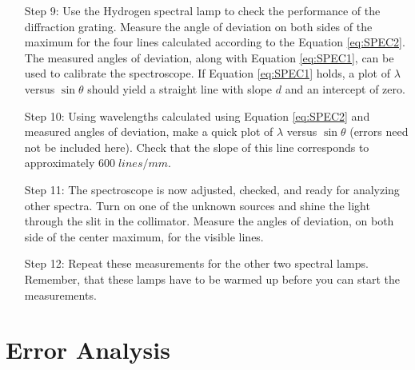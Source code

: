 \documentclass[12pt, a4paper, oneside, openright, titlepage]{book}
\begin{document}
\begin{itemize}[leftmargin = 50pt]
    \item[Step 9:] Use the Hydrogen spectral lamp to check the performance of the diffraction grating. Measure the angle of deviation on both sides of the maximum for the four lines calculated according to the Equation \ref{eq:SPEC2}. The measured angles of deviation, along with Equation \ref{eq:SPEC1}, can be used to calibrate the spectroscope. If Equation \ref{eq:SPEC1} holds, a plot of $\lambda$ versus $\sin\theta$ should yield a straight line with slope $d$ and an intercept of zero.
    \item[Step 10:] Using wavelengths calculated using Equation \ref{eq:SPEC2} and measured angles of deviation, make a quick plot of $\lambda$ versus $\sin\theta$ (errors need not be included here). Check that the slope of this line corresponds to approximately $600 \;lines/mm$.
    \item[Step 11:] The spectroscope is now adjusted, checked, and ready for analyzing other spectra. Turn on one of the unknown sources and shine the light through the slit in the collimator. Measure the angles of deviation, on both side of the center maximum, for the visible lines.
    \item[Step 12:] Repeat these measurements for the other two spectral lamps. Remember, that these lamps have to be warmed up before you can start the measurements.
\end{itemize}

\section{Error Analysis}
\end{document}
